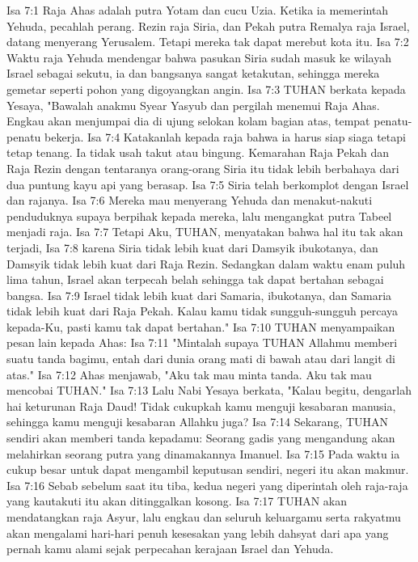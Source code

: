 Isa 7:1  Raja Ahas adalah putra Yotam dan cucu Uzia. Ketika ia memerintah Yehuda, pecahlah perang. Rezin raja Siria, dan Pekah putra Remalya raja Israel, datang menyerang Yerusalem. Tetapi mereka tak dapat merebut kota itu.
Isa 7:2  Waktu raja Yehuda mendengar bahwa pasukan Siria sudah masuk ke wilayah Israel sebagai sekutu, ia dan bangsanya sangat ketakutan, sehingga mereka gemetar seperti pohon yang digoyangkan angin.
Isa 7:3  TUHAN berkata kepada Yesaya, "Bawalah anakmu Syear Yasyub dan pergilah menemui Raja Ahas. Engkau akan menjumpai dia di ujung selokan kolam bagian atas, tempat penatu-penatu bekerja.
Isa 7:4  Katakanlah kepada raja bahwa ia harus siap siaga tetapi tetap tenang. Ia tidak usah takut atau bingung. Kemarahan Raja Pekah dan Raja Rezin dengan tentaranya orang-orang Siria itu tidak lebih berbahaya dari dua puntung kayu api yang berasap.
Isa 7:5  Siria telah berkomplot dengan Israel dan rajanya.
Isa 7:6  Mereka mau menyerang Yehuda dan menakut-nakuti penduduknya supaya berpihak kepada mereka, lalu mengangkat putra Tabeel menjadi raja.
Isa 7:7  Tetapi Aku, TUHAN, menyatakan bahwa hal itu tak akan terjadi,
Isa 7:8  karena Siria tidak lebih kuat dari Damsyik ibukotanya, dan Damsyik tidak lebih kuat dari Raja Rezin. Sedangkan dalam waktu enam puluh lima tahun, Israel akan terpecah belah sehingga tak dapat bertahan sebagai bangsa.
Isa 7:9  Israel tidak lebih kuat dari Samaria, ibukotanya, dan Samaria tidak lebih kuat dari Raja Pekah. Kalau kamu tidak sungguh-sungguh percaya kepada-Ku, pasti kamu tak dapat bertahan."
Isa 7:10  TUHAN menyampaikan pesan lain kepada Ahas:
Isa 7:11  "Mintalah supaya TUHAN Allahmu memberi suatu tanda bagimu, entah dari dunia orang mati di bawah atau dari langit di atas."
Isa 7:12  Ahas menjawab, "Aku tak mau minta tanda. Aku tak mau mencobai TUHAN."
Isa 7:13  Lalu Nabi Yesaya berkata, "Kalau begitu, dengarlah hai keturunan Raja Daud! Tidak cukupkah kamu menguji kesabaran manusia, sehingga kamu menguji kesabaran Allahku juga?
Isa 7:14  Sekarang, TUHAN sendiri akan memberi tanda kepadamu: Seorang gadis yang mengandung akan melahirkan seorang putra yang dinamakannya Imanuel.
Isa 7:15  Pada waktu ia cukup besar untuk dapat mengambil keputusan sendiri, negeri itu akan makmur.
Isa 7:16  Sebab sebelum saat itu tiba, kedua negeri yang diperintah oleh raja-raja yang kautakuti itu akan ditinggalkan kosong.
Isa 7:17  TUHAN akan mendatangkan raja Asyur, lalu engkau dan seluruh keluargamu serta rakyatmu akan mengalami hari-hari penuh kesesakan yang lebih dahsyat dari apa yang pernah kamu alami sejak perpecahan kerajaan Israel dan Yehuda.

